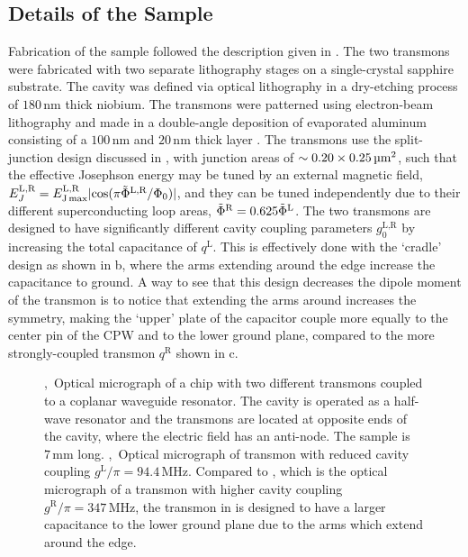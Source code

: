 \subsection{Details of the Sample}
Fabrication of the sample followed the description given in \cite{schreier_suppressing_2008}. The two transmons were fabricated with two separate lithography stages on a single-crystal sapphire substrate. The cavity was defined via optical lithography in a dry-etching process of $180\,\text{nm}$ thick niobium. The transmons were patterned using electron-beam lithography and made in a double-angle deposition of evaporated aluminum consisting of a $100\,\text{nm}$ and $20\,\text{nm}$ thick layer \cite{frunzio_fabrication_2005}. The transmons use the split-junction design discussed in , with junction areas of $\sim 0.20 \times 0.25\,\text{\textmu m}^2$, such that the effective Josephson energy may be tuned by an external magnetic field, $E_{J}^\text{L,R} = E^{\text{L,R}}_{\text{J\,max}} \lvert\cos(\pi \tilde{\Phi}^\text{L,R}/\Phi_0)\rvert$, and they can be tuned independently due to their different superconducting loop areas, $\tilde{\Phi}^\text{R} = 0.625 \tilde{\Phi}^\text{L}$. The two transmons are designed to have significantly different cavity coupling parameters $g^\text{L,R}_{0}$ by increasing the total capacitance of $q^\text{L}$. This is effectively done with the `cradle' design as shown in b, where the arms extending around the edge increase the capacitance to ground. A way to see that this design decreases the dipole moment of the transmon is to notice that extending the arms around increases the symmetry, making the `upper' plate of the capacitor couple more equally to the center pin of the CPW and to the lower ground plane, compared to the more strongly-coupled transmon $q^\text{R}$ shown in c.%
\begin{figure}
\centering
{}
\caption[Two-transmon circuit QED sample]
{ ,~Optical micrograph of a chip with two different transmons coupled to a coplanar waveguide resonator. The cavity is operated as a half-wave resonator and the transmons are located at opposite ends of the cavity, where the electric field has an anti-node. The sample is $7\,\text{mm}$ long. ,~Optical micrograph of transmon with reduced cavity coupling $g^{\text{L}}/\pi = 94.4\,\text{MHz}$. Compared to , which is the optical micrograph of a transmon with higher cavity coupling $g^\text{R}/\pi = 347\,\text{MHz}$, the transmon in  is designed to have a larger capacitance to the lower ground plane due to the arms which extend around the edge.\label{sample}}
\end{figure}

